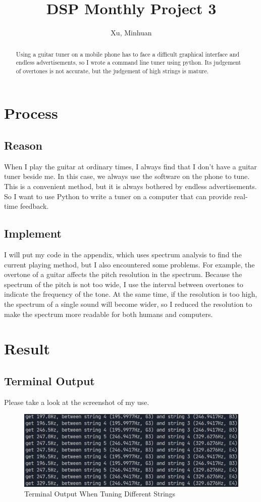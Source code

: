 \documentclass{article}
\begin{document}
\title{DSP Monthly Project 3}
\author{Xu, Minhuan}
\maketitle
\tableofcontents
\begin{abstract}
Using a guitar tuner on a mobile phone has to face a difficult graphical interface and endless advertisements, so I wrote a command line tuner using python. Its judgement of overtones is not accurate, but the judgement of high strings is mature.
\end{abstract}


\section{Process}
\subsection{Reason}
When I play the guitar at ordinary times, I always find that I don't have a guitar tuner beside me. In this case, we always use the software on the phone to tune. This is a convenient method, but it is always bothered by endless advertisements. So I want to use Python to write a tuner on a computer that can provide real-time feedback.
\subsection{Implement}
I will put my code in the appendix, which uses spectrum analysis to find the current playing method, but I also encountered some problems. For example, the overtone of a guitar affects the pitch resolution in the spectrum. Because the spectrum of the pitch is not too wide, I use the interval between overtones to indicate the frequency of the tone. At the same time, if the resolution is too high, the spectrum of a single sound will become wider, so I reduced the resolution to make the spectrum more readable for both humans and computers.
\section{Result}
\subsection{Terminal Output}
Please take a look at the screenshot of my use.
\begin{figure}[!h]
	\centering
	\includegraphics[width=3 in]{../pic/out1.png}
	\caption{Terminal Output When Tuning Different Strings}
	\label{fig:output}
\end{figure}
\end{document}
